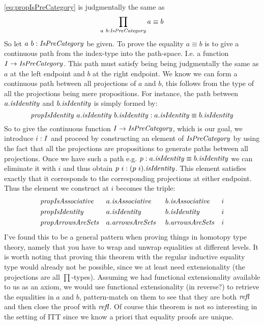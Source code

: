 \ref{eq:propIsPreCategory} is judgmentally the same as
%
$$
\prod_{a\ b \mathrel{:} \mathit{IsPreCategory}} a \equiv b
$$
%
So let $a\ b \tp \IsPreCategory$ be given. To prove the equality $a \equiv b$ is
to give a continuous path from the index-type into the path-space. I.e. a
function $I \to \mathit{IsPreCategory}$. This path must satisfy being being judgmentally
the same as $a$ at the left endpoint and $b$ at the right endpoint. We know we
can form a continuous path between all projections of $a$ and $b$, this follows
from the type of all the projections being mere propositions. For instance, the
path between $a.\mathit{isIdentity}$ and $b.\mathit{isIdentity}$ is simply formed by:
%
$$
\mathit{propIsIdentity}\ a.\mathit{isIdentity}\ b.\mathit{isIdentity}
\mathrel{:}
a.\mathit{isIdentity} \equiv b.\mathit{isIdentity}
$$
%
So to give the continuous function $I \to \mathit{IsPreCategory}$, which is our goal, we
introduce $i \mathrel{:} I$ and proceed by constructing an element of $\mathit{IsPreCategory}$
by using the fact that all the projections are propositions to generate paths
between all projections. Once we have such a path e.g. $p \mathrel{:} a.\mathit{isIdentity}
\equiv b.\mathit{isIdentity}$ we can eliminate it with $i$ and thus obtain $p\ i \mathrel{:}
(p\ i).\mathit{isIdentity}$. This element satisfies exactly that it corresponds to the
corresponding projections at either endpoint. Thus the element we construct at
$i$ becomes the triple:
%
\begin{equation}
\label{eq:proof-prop-IsPreCategory}
\begin{aligned}
  & \mathit{propIsAssociative} && a.\mathit{isAssociative}\
       && b.\mathit{isAssociative} && i  \\
  & \mathit{propIsIdentity}    && a.\mathit{isIdentity}\
       && b.\mathit{isIdentity}    && i  \\
  & \mathit{propArrowsAreSets} && a.\mathit{arrowsAreSets}\
       && b.\mathit{arrowsAreSets} && i
\end{aligned}
\end{equation}
%
I've found this to be a general pattern when proving things in homotopy type
theory, namely that you have to wrap and unwrap equalities at different levels.
It is worth noting that proving this theorem with the regular inductive equality
type would already not be possible, since we at least need extensionality (the
projections are all $\prod$-types). Assuming we had functional extensionality
available to us as an axiom, we would use functional extensionality (in
reverse?) to retrieve the equalities in $a$ and $b$, pattern-match on them to
see that they are both $\mathit{refl}$ and then close the proof with $\mathit{refl}$.
Of course this theorem is not so interesting in the setting of ITT since we know
a priori that equality proofs are unique.

